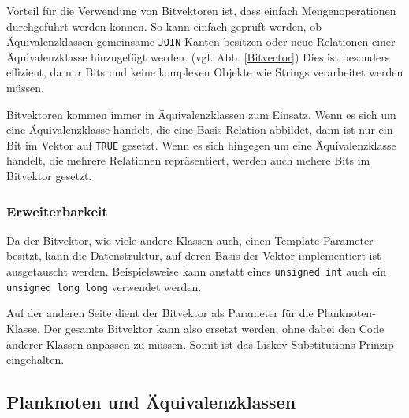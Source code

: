 Vorteil für die Verwendung von Bitvektoren ist, dass einfach Mengenoperationen durchgeführt werden können. So kann einfach geprüft werden, ob Äquivalenzklassen gemeinsame \texttt{JOIN}-Kanten besitzen oder neue Relationen einer Äquivalenzklasse hinzugefügt werden. (vgl. Abb. \ref{Bitvector}) Dies ist besonders effizient, da nur Bits und keine komplexen Objekte wie Strings verarbeitet werden müssen.



Bitvektoren kommen immer in Äquivalenzklassen zum Einsatz. Wenn es sich um eine Äquivalenzklasse handelt, die eine Basis-Relation abbildet, dann ist nur ein Bit im Vektor auf \texttt{TRUE} gesetzt. Wenn es sich hingegen um eine Äquivalenzklasse handelt, die mehrere Relationen repräsentiert, werden auch mehere Bits im Bitvektor gesetzt.



\subsubsection{Erweiterbarkeit}

Da der Bitvektor, wie viele andere Klassen auch, einen Template Parameter besitzt, kann die Datenstruktur, auf deren Basis der Vektor implementiert ist ausgetauscht werden. Beispielsweise kann anstatt eines \texttt{unsigned int} auch ein \texttt{unsigned long long} verwendet werden.

Auf der anderen Seite dient der Bitvektor als Parameter für die Planknoten-Klasse. Der gesamte Bitvektor kann also ersetzt werden, ohne dabei den Code anderer Klassen anpassen zu müssen. Somit ist das Liskov Substitutions Prinzip eingehalten.


\subsection{Planknoten und Äquivalenzklassen}


